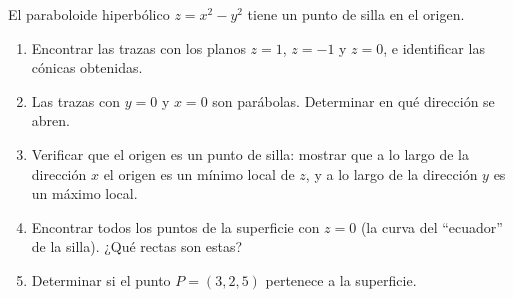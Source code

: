 El paraboloide hiperbólico $z = x^2 - y^2$ tiene un punto de silla en el origen.
\begin{enumerate}
    \item Encontrar las trazas con los planos $z = 1$, $z = -1$ y $z = 0$, e identificar las cónicas obtenidas.
    \item Las trazas con $y = 0$ y $x = 0$ son parábolas. Determinar en qué dirección se abren.
    \item Verificar que el origen es un punto de silla: mostrar que a lo largo de la dirección $x$ el origen es un mínimo local de $z$, y a lo largo de la dirección $y$ es un máximo local.
    \item Encontrar todos los puntos de la superficie con $z = 0$ (la curva del ``ecuador'' de la silla). ¿Qué rectas son estas?
    \item Determinar si el punto $P = (3, 2, 5)$ pertenece a la superficie.
\end{enumerate}